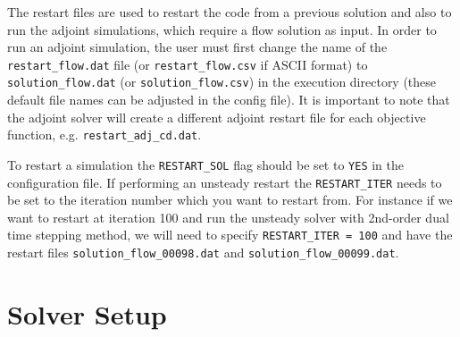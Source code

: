 \documentclass{article}
\begin{document}
The restart files are used to restart the code from a previous solution and also to run the adjoint simulations, which require a flow solution as input. In order to run an adjoint simulation, the user must first change the name of the \verb|restart_flow.dat| file (or \verb|restart_flow.csv| if ASCII format) to \verb|solution_flow.dat| (or \verb|solution_flow.csv|) in the execution directory (these default file names can be adjusted in the config file). It is important to note that the adjoint solver will create a different adjoint restart file for each objective function, e.g. \verb|restart_adj_cd.dat|.

To restart a simulation the \verb|RESTART_SOL| flag should be set to \verb|YES| in the configuration file. If performing an unsteady restart the \verb|RESTART_ITER| needs to be set to the iteration number which you want to restart from. For instance if we want to restart at iteration 100 and run the unsteady solver with 2nd-order dual time stepping method, we will need to specify \verb|RESTART_ITER = 100| and have the restart files \verb|solution_flow_00098.dat| and \verb|solution_flow_00099.dat|.


\newpage
\section{Solver Setup}
\end{document}
